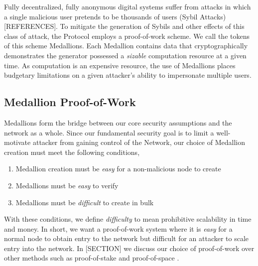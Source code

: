 
Fully decentralized, fully anonymous digital systems suffer from attacks in which a single malicious user pretends to be thousands of users (Sybil Attacks) {\color{red}[REFERENCES]}. To mitigate the generation of Sybils and other effects of this class of attack, the \Orchid{} Protocol employs a proof-of-work scheme. We call the tokens of this scheme Medallions. Each Medallion contains data that cryptographically demonstrates the generator possessed a \textit{sizable} computation resource at a given time. As
computation is an expensive resource, the use of Medallions places budgetary limitations on a given attacker's ability to impersonate multiple users.

\subsection{Medallion Proof-of-Work}
\label{medallion-pow}

Medallions form the bridge between our core security assumptions and the network as a whole. Since our fundamental security goal is to limit a well-motivate attacker from gaining control of the \Orchid{} Network, our choice of Medallion creation must meet the following conditions,
  \begin{enumerate}
      \item Medallion creation must be \textit{easy} for a non-malicious node to create
      \item Medallions  must be \textit{easy} to verify
      \item Medallions must be \textit{difficult} to create in bulk
  \end{enumerate}
With these conditions, we define \textit{difficulty} to mean prohibitive scalability in time and money. In short, we want a proof-of-work system where it is \textit{easy} for a normal node to obtain entry to the network but difficult for an attacker to scale entry into the network. In {\color{red}[SECTION]} we discuss our choice of proof-of-work over other methods such as proof-of-stake \cite{bentov2016snow, kiayias2017ouroboros, houy2014will} and proof-of-space \cite{dziembowski2015proofs, park2015spacecoin}.

